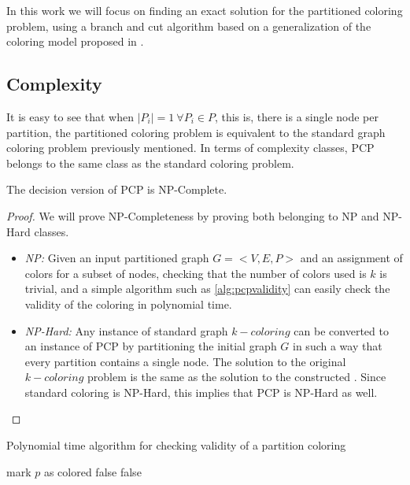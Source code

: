 In this work we will focus on finding an exact solution for the partitioned coloring problem, using a branch and cut algorithm based on a generalization of the coloring model proposed in \cite{mendez2006branch,mendez2008cutting}.

\subsection*{Complexity}

It is easy to see that when $|P_i| = 1\ \forall P_i \in P$, this is, there is a single node per partition, the partitioned coloring problem is equivalent to the standard graph coloring problem previously mentioned. In terms of complexity classes, PCP belongs to the same class as the standard coloring problem.

\begin{theorem}
The decision version of PCP is NP-Complete.
\end{theorem}

\begin{proof}
We will prove NP-Completeness by proving both belonging to NP and NP-Hard classes.

\begin{itemize}
\item{\textit{NP:} Given an input partitioned graph $G = <V,E,P>$ and an assignment of colors for a subset of nodes, checking that the number of colors used is $k$ is trivial, and a simple algorithm such as \ref{alg:pcpvalidity} can easily check the validity of the coloring in polynomial time.}
\item{\textit{NP-Hard:} Any instance of standard graph $k-coloring$ can be converted to an instance of PCP by partitioning the initial graph $G$ in such a way that every partition contains a single node. The solution to the original $k-coloring$ problem is the same as the solution to the constructed \PCP{}. Since standard coloring is NP-Hard, this implies that PCP is NP-Hard as well.}
\end{itemize}

\end{proof}

\begin{algorithm}
\caption{Polynomial time algorithm for checking validity of a partition coloring}
\label{alg:pcpvalidity}
\begin{algorithmic}

			\STATE mark $p$ as colored
					\RETURN false
				\ENDIF	
			\ENDFOR
		\ENDIF
	\ENDFOR
		\RETURN false
	\ENDIF	
\ENDFOR

\end{algorithmic}
\end{algorithm}

